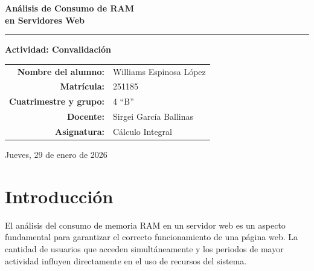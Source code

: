 \documentclass[12pt,a4paper]{article}
\begin{document}
\begin{titlepage}

\vspace*{3cm}
\centering

{\bfseries\fontsize{20}{24}\selectfont Análisis de Consumo de RAM\\
en Servidores Web\par}

\vspace{0.4cm}
{\color{azul}\rule{8cm}{2pt}\par}

\vspace{1.5cm}
{\bfseries Actividad: Convalidación\par}

\vspace{2cm}

\begin{tabular}{rl}
\textbf{Nombre del alumno:} & Williams Espinosa López \\
\textbf{Matrícula:} & 251185 \\
\textbf{Cuatrimestre y grupo:} & 4\textordmasculine{} ``B'' \\
\textbf{Docente:} & Sirgei García Ballinas \\
\textbf{Asignatura:} & Cálculo Integral
\end{tabular}

\vfill
Jueves, 29 de enero de 2026
\end{titlepage}

\tableofcontents
\newpage

\section{Introducción}

El análisis del consumo de memoria RAM en un servidor web es un aspecto fundamental para garantizar el correcto funcionamiento de una página web. La cantidad de usuarios que acceden simultáneamente y los periodos de mayor actividad influyen directamente en el uso de recursos del sistema.
\end{document}
